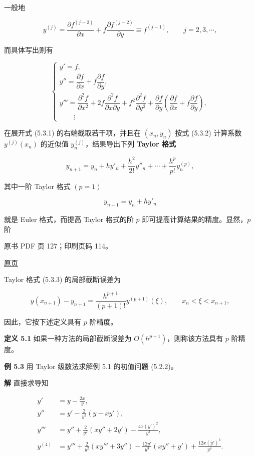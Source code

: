 一般地

\[
y^{(j)}=\frac{\partial f^{(j-2)}}{\partial x}+f\frac{\partial f^{(j-2)}}{\partial y}\equiv f^{(j-1)},\qquad j=2,3,\cdots,
\]

而具体写出则有

\[
\begin{cases}
y'=f,\\
y''=\dfrac{\partial f}{\partial x}+f\dfrac{\partial f}{\partial y},\\
y'''=\dfrac{\partial^2f}{\partial x^2}+2f\dfrac{\partial^2f}{\partial x\partial y}
+f^2\dfrac{\partial^2f}{\partial y^2}
+\dfrac{\partial f}{\partial y}\left(\dfrac{\partial f}{\partial x}+f\dfrac{\partial f}{\partial y}\right),\\
\qquad\vdots
\end{cases}\tag{5.3.2}
\]

在展开式 (5.3.1) 的右端截取若干项，并且在 \((x_n,y_n)\) 按式 (5.3.2) 计算系数 \(y^{(j)}(x_n)\) 的近似值 \(y_n^{(j)}\)，结果导出下列 \textbf{Taylor 格式}

\[
y_{n+1}=y_n+hy'_n+\frac{h^2}{2!}y''_n+\cdots+\frac{h^p}{p!}y_n^{(p)},\tag{5.3.3}
\]

其中一阶 Taylor 格式 \((p=1)\)

\[
y_{n+1}=y_n+hy'_n
\]

就是 Euler 格式，而提高 Taylor 格式的阶 \(p\) 即可提高计算结果的精度。显然，\(p\) 阶

\clearpage

原书 PDF 页 127；印刷页码 114。

\href{source-images/pdf-127.jpeg}{原页}

Taylor 格式 (5.3.3) 的局部截断误差为

\[
y(x_{n+1})-y_{n+1}=\frac{h^{p+1}}{(p+1)!}y^{(p+1)}(\xi),\qquad x_n<\xi<x_{n+1},
\]

因此，它按下述定义具有 \(p\) 阶精度。

\textbf{定义 5.1} 如果一种方法的局部截断误差为 \(O(h^{p+1})\)，则称该方法具有 \(p\) 阶精度。

\textbf{例 5.3} 用 Taylor 级数法求解例 5.1 的初值问题 (5.2.2)。

\textbf{解} 直接求导知

\[
\begin{aligned}
y'&=y-\frac{2x}{y},\\
y''&=y'-\frac{2}{y^2}(y-xy'),\\
y'''&=y''+\frac{2}{y^2}(xy''+2y')-\frac{4x(y')^2}{y^3},\\
y^{(4)}&=y'''+\frac{2}{y^2}(xy'''+3y'')-\frac{12y'}{y^3}(xy''+y')+\frac{12x(y')^3}{y^4}.
\end{aligned}
\]

